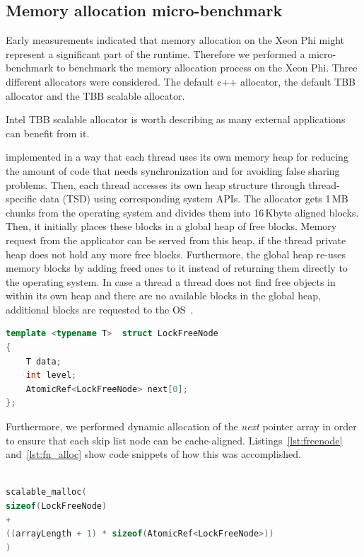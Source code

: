 \subsection{Memory allocation micro-benchmark}
Early measurements indicated that memory allocation on the Xeon Phi might represent a significant part of the runtime. Therefore we performed a micro-benchmark to benchmark the memory allocation process on the Xeon Phi. Three different allocators were considered. The default c++ allocator, the default TBB allocator and the TBB scalable allocator. 

Intel TBB scalable allocator is worth describing as many external applications can benefit from it. 

implemented in a way that each thread uses its own memory heap for reducing the amount of code that needs synchronization and for avoiding false sharing problems. Then, each thread accesses its own heap structure through thread-specific data (TSD) using corresponding system APIs. The allocator gets 1\,MB chunks from the operating system and divides them into 16\,Kbyte aligned blocks. Then, it initially places these blocks in a global heap of free blocks. Memory request from the applicator can be served from this heap, if the thread private heap does not hold any more free blocks. Furthermore, the global heap re-uses memory blocks by adding freed ones to it instead of returning them directly to the operating system. In case a thread a thread does not find free objects in within its own heap and there are no available blocks in the global heap, additional blocks are requested to the OS~\cite{_thefoundations,Hudson:2006:MST:1133956.1133967}. %

\begin{lstlisting}[language=C++,basicstyle=\tt\scriptsize,captionpos=b,caption=Lock free node structure,label=lst:freenode,morekeywords={*, size_t}]
template <typename T>  struct LockFreeNode
{	
	T data;
	int	level;
	AtomicRef<LockFreeNode>	next[0];
};
\end{lstlisting}

Furthermore, we performed dynamic allocation of the {\em next} pointer array in order to ensure that each skip list node can be cache-aligned. Listings~\ref{lst:freenode} and~\ref{lst:fn_alloc} show code snippets of how this was accomplished.
\begin{lstlisting}[language=C++,basicstyle=\tt\scriptsize,captionpos=b,caption=Memory allocation instruction for array of atomic references,label=lst:fn_alloc, morekeywords={*, size_t}]

scalable_malloc(
sizeof(LockFreeNode) 
+ 
((arrayLength + 1) * sizeof(AtomicRef<LockFreeNode>))
)
\end{lstlisting}

